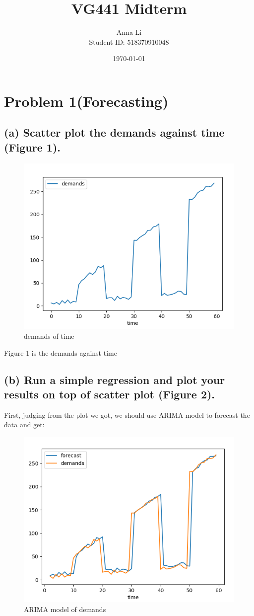 \documentclass[a4paper,12pt]{journal}
\title{VG441 Midterm}
\author{Anna Li \\Student ID: 518370910048}
\date{\today}
\begin{document}
	\maketitle
	\section*{Problem 1(Forecasting)}
	\subsection*{(a) Scatter plot the demands against time (Figure 1).}
	\begin{figure}[htbp]
		\centering
		\includegraphics[scale=0.7]{1_a_1.png}
		\caption{demands of time}
	\end{figure}
    Figure 1 is the demands against time
    \subsection*{(b) Run a simple regression and plot your results on top of scatter plot (Figure 2).}
    First, judging from the plot we got, we should use ARIMA model to forecast the data and get:
    \begin{figure}[htbp]
    	\centering
    	\includegraphics[scale=0.8]{1_b_1.png}
    	\caption{ARIMA model of demands}
    \end{figure}
\end{document}
